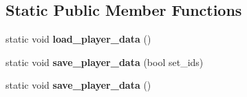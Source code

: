 \subsection*{Static Public Member Functions}
\begin{DoxyCompactItemize}
\item 
\mbox{\label{class_level_manager_a0a7875c9aa97c40162ac48bf95e9454d}} 
static void {\bfseries load\+\_\+player\+\_\+data} ()
\item 
\mbox{\label{class_level_manager_a6f4409d829188d187674d30bf5832028}} 
static void {\bfseries save\+\_\+player\+\_\+data} (bool set\+\_\+ids)
\item 
\mbox{\label{class_level_manager_a978a6920356cfd8941a38abcf0133897}} 
static void {\bfseries save\+\_\+player\+\_\+data} ()
\end{DoxyCompactItemize}
